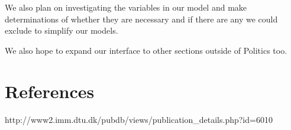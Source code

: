 \documentclass[10pt,letterpaper]{article}
\begin{document}
We also plan on investigating the variables in our model and make
determinations of whether they are necessary and if there are any we
could exclude to simplify our models.

We also hope to expand our interface to other sections outside of
Politics too.

\section*{References}\label{references}

http://www2.imm.dtu.dk/pubdb/views/publication\_details.php?id=6010

\nolinenumbers
\end{document}
